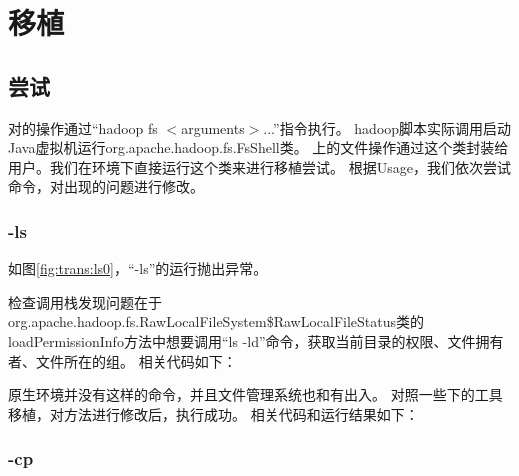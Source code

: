 %
\chapter{\HadoopFS 移植}
\label{ch:trans}

%
%
\section{尝试}
\label{sec:trans:try}
对{\HFS}的操作通过``hadoop fs $<$arguments$>$...''指令执行。
hadoop脚本实际调用启动Java虚拟机运行org.apache.hadoop.fs.FsShell类。
{\HFS}上的文件操作通过这个类封装给用户。我们在{\Windows}环境下直接运行这个类来进行移植尝试。
根据Usage，我们依次尝试命令，对出现的问题进行修改。

%
%
\subsection{-ls}
\label{subsec:trans:ls}
如图\ref{fig:trans:ls0}，``-ls''的运行抛出异常。


检查调用栈发现问题在于org.apache.hadoop.fs.RawLocalFileSystem\$RawLocalFileStatus类的loadPermissionInfo方法中想要调用``ls -ld''命令，获取当前目录的权限、文件拥有者、文件所在的组。
相关代码如下：



原生{\Windows}环境并没有这样的命令，并且文件管理系统也和{\Unix}有出入。
对照一些{\Windows}下的{\Unix}工具移植，对方法进行修改后，执行成功。
相关代码和运行结果如下：




%
%
\subsection{-cp}
\label{subsec:trans:cp}

